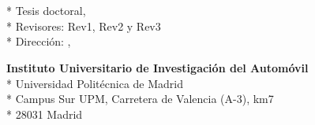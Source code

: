 \cleardoublepage
\begin{fullwidth}
~\vfill
\thispagestyle{empty}
\setlength{\parindent}{0pt}
\setlength{\parskip}{\baselineskip}
\phdauthor

\par{
	\textit{\phdtitle}\\*
	Tesis doctoral, \thedate\\*
	Revisores: Rev1, Rev2 y Rev3\\*
	Dirección: \thanklessadvisorone, \thanklessadvisortwo
	}

\par{
	\textbf{Instituto Universitario de Investigación del Automóvil}\\*
	Universidad Politécnica de Madrid\\*
	Campus Sur UPM, Carretera de Valencia (A-3), km7\\*
	28031 Madrid
}

\par{
	\doclicenseThis
}

\end{fullwidth}
